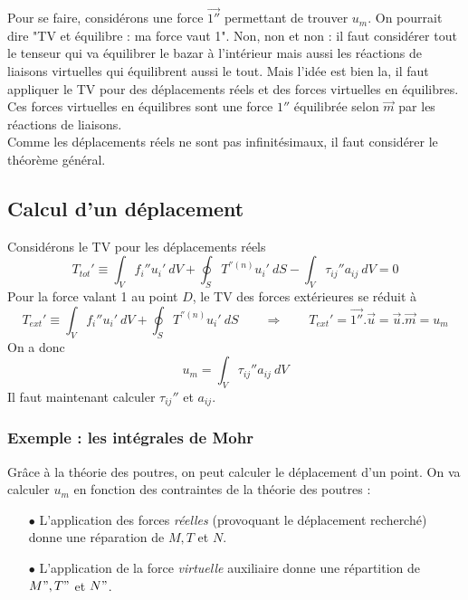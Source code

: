 		Pour se faire, considérons une force $\vec{1''}$ permettant de 
		trouver $u_m$. On pourrait dire "TV et équilibre : ma force vaut 
		1". Non, non et non : il faut considérer tout le tenseur qui va 
		équilibrer le bazar à l'intérieur mais aussi les réactions de 
		liaisons virtuelles qui équilibrent aussi le tout.
		Mais l'idée est bien la, il faut appliquer le TV pour des 
		déplacements réels et des forces virtuelles en équilibres. Ces 
		forces virtuelles en équilibres sont une force $1''$ équilibrée 
		selon $\vec{m}$ par les réactions de liaisons.\\
		Comme les déplacements réels ne sont pas infinitésimaux, il faut 
		considérer le théorème général.
		
		
	\subsection{Calcul d'un déplacement}
	Considérons le TV pour les déplacements réels
	\begin{equation}
	T_{tot}' \equiv \int_V f_i''u_i'\ dV + \oint_S T^{''(n)}u_i'\ dS - 
	\int_V \tau_{ij}''a_{ij}\ dV = 0
	\end{equation}
	Pour la force valant 1 au point $D$, le TV des forces extérieures se 
	réduit à 
	\begin{equation}
	T_{ext}' \equiv \int_V f_i''u_i'\ dV + \oint_S T^{''(n)}u_i'\ dS\qquad
	\Longrightarrow\qquad T_{ext}' = \vec{1''}.\vec{u} = \vec{u}.\vec{m}=u_m
	\end{equation}
	On a donc
	\begin{equation}
	u_m = \int_V \tau_{ij}''a_{ij}\ dV
	\end{equation}
	Il faut maintenant calculer $\tau_{ij}''$ et $a_{ij}$.
	
		\subsubsection{Exemple : les intégrales de Mohr}
		Grâce à la théorie des poutres, on peut calculer le déplacement 
		d'un point. On va calculer $u_m$ en fonction des contraintes de 
		la théorie des poutres :
		\begin{itemize}
		\item[$\bullet$] L'application des forces \textit{réelles} 
		(provoquant le déplacement recherché) donne une réparation de $M, 
		T$ et $N$.
		\item[$\bullet$] L’application de la force \textit{virtuelle} 
		auxiliaire donne une répartition de $M", T"$ et $N"$.
		\end{itemize}
		
